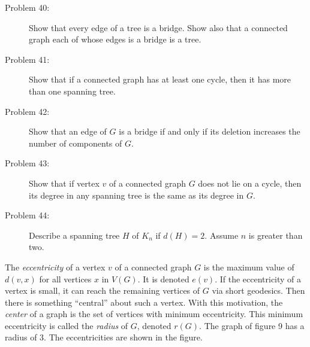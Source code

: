 \documentclass{article}
\begin{document}
\begin{description}

\item[Problem 40:] Show that every edge of a tree is a bridge. Show also that a connected graph each of whose edges is a bridge is a tree.

\item[Problem 41:] Show that if a connected graph has at least one cycle, then it has more than one spanning tree.

\item[Problem 42:] Show that an edge of $G$ is a bridge if and only if its deletion increases the number of components of $G$.

\item[Problem 43:] Show that if vertex $v$ of a connected graph $G$ does not lie on a cycle, then its degree in any spanning tree is the same as its degree in $G$.

\item[Problem 44:] Describe a spanning tree $H$ of $K_n$ if $d(H)=2$. Assume $n$ is greater than two. 

\end{description}

The \emph{eccentricity} of a vertex $v$ of a connected graph $G$ is the maximum value of $d(v,x)$ for all vertices $x$ in $V(G)$. It is denoted $e(v)$. If the eccentricity of a vertex is small, it can reach the remaining vertices of $G$ via short geodesics. Then there is something ``central'' about such a vertex. With this motivation, the \emph{center} of a graph is the set of vertices with minimum eccentricity. This minimum eccentricity is called the \emph{radius} of $G$, denoted $r(G)$. The graph of figure 9 has a radius of $3$. The eccentricities are shown in the figure.
\end{document}
